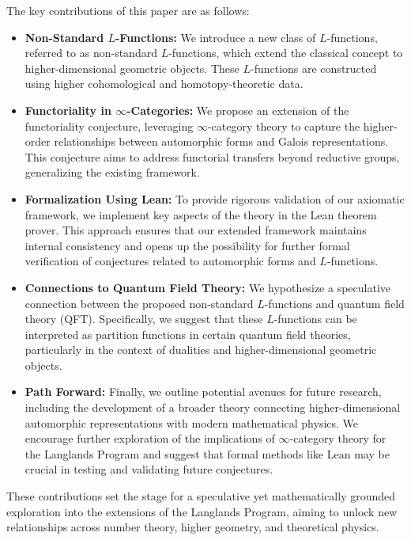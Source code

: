 \documentclass{article}
\theoremstyle{remark}
\begin{document}
The key contributions of this paper are as follows:
\begin{itemize}
    \item \textbf{Non-Standard $L$-Functions:} We introduce a new class of $L$-functions, referred to as non-standard $L$-functions, which extend the classical concept to higher-dimensional geometric objects. These $L$-functions are constructed using higher cohomological and homotopy-theoretic data.
    
    \item \textbf{Functoriality in $\infty$-Categories:} We propose an extension of the functoriality conjecture, leveraging $\infty$-category theory to capture the higher-order relationships between automorphic forms and Galois representations. This conjecture aims to address functorial transfers beyond reductive groups, generalizing the existing framework.
    
    \item \textbf{Formalization Using Lean:} To provide rigorous validation of our axiomatic framework, we implement key aspects of the theory in the Lean theorem prover. This approach ensures that our extended framework maintains internal consistency and opens up the possibility for further formal verification of conjectures related to automorphic forms and $L$-functions.
    
    \item \textbf{Connections to Quantum Field Theory:} We hypothesize a speculative connection between the proposed non-standard $L$-functions and quantum field theory (QFT). Specifically, we suggest that these $L$-functions can be interpreted as partition functions in certain quantum field theories, particularly in the context of dualities and higher-dimensional geometric objects.
    
    \item \textbf{Path Forward:} Finally, we outline potential avenues for future research, including the development of a broader theory connecting higher-dimensional automorphic representations with modern mathematical physics. We encourage further exploration of the implications of $\infty$-category theory for the Langlands Program and suggest that formal methods like Lean may be crucial in testing and validating future conjectures.
\end{itemize}

These contributions set the stage for a speculative yet mathematically grounded exploration into the extensions of the Langlands Program, aiming to unlock new relationships across number theory, higher geometry, and theoretical physics.
\end{document}

